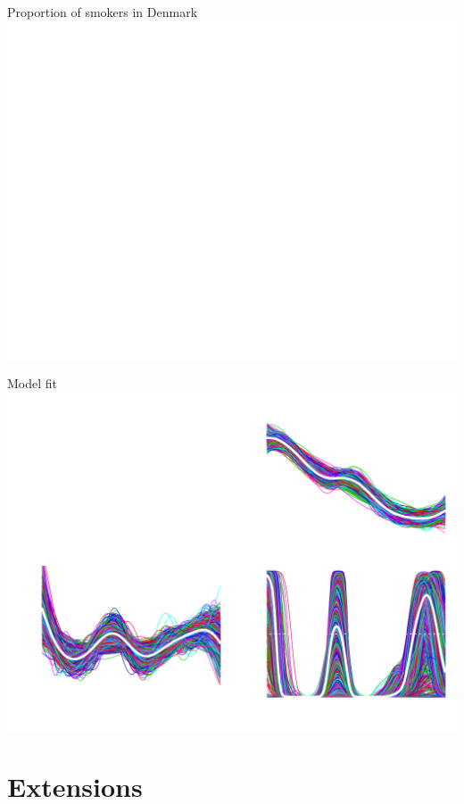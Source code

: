 \documentclass[ignorenonframetext,xcolor=pdflatex,table,dvipsnames,serif]{beamer}
\begin{document}
\begin{frame}{Proportion of smokers in Denmark}
\center\includegraphics[scale=0.5]{smokersData}
\end{frame}

\begin{frame}{Model fit}
  \center\includegraphics[scale=0.5]{smoking1}
\end{frame}



\section{Extensions}
\end{document}
